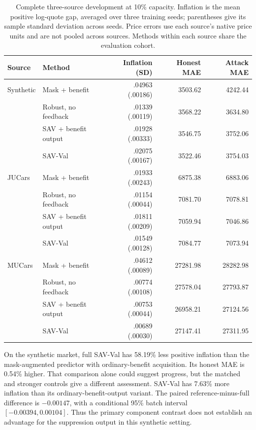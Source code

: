 \documentclass[10pt,journal]{IEEEtran}
\begin{document}
\begin{table}[t]
\centering
\caption{Complete three-source development at 10\% capacity. Inflation is
the mean positive log-quote gap, averaged over three training seeds;
parentheses give its sample standard deviation across seeds. Price errors
use each source's native price units and are not pooled across sources.
Methods within each source share the evaluation cohort.}
\label{tab:synthetic_development}
\begin{tabular}{llrrr}
\toprule
Source & Method & Inflation (SD) & Honest MAE & Attack MAE\\
\midrule
Synthetic & Mask + benefit & .04963 (.00186) & 3503.62 & 4242.44\\
 & Robust, no feedback & .01339 (.00119) & 3568.22 & 3634.80\\
 & SAV + benefit output & .01928 (.00333) & 3546.75 & 3752.06\\
 & SAV-Val & .02075 (.00167) & 3522.46 & 3754.03\\
\midrule
JUCars & Mask + benefit & .01933 (.00243) & 6875.38 & 6883.06\\
 & Robust, no feedback & .01154 (.00044) & 7081.70 & 7078.81\\
 & SAV + benefit output & .01811 (.00209) & 7059.94 & 7046.86\\
 & SAV-Val & .01549 (.00128) & 7084.77 & 7073.94\\
\midrule
MUCars & Mask + benefit & .04612 (.00089) & 27281.98 & 28282.98\\
 & Robust, no feedback & .00774 (.00108) & 27578.04 & 27793.87\\
 & SAV + benefit output & .00753 (.00044) & 26958.21 & 27124.56\\
 & SAV-Val & .00689 (.00030) & 27147.41 & 27311.95\\
\bottomrule
\end{tabular}
\end{table}

On the synthetic market, full SAV-Val has 58.19\% less positive inflation than the mask-augmented
predictor with ordinary-benefit acquisition. Its honest MAE is 0.54\%
higher. That comparison alone could suggest progress, but the matched
and stronger controls give a different assessment. SAV-Val has 7.63\%
more inflation than its ordinary-benefit-output variant. The paired
reference-minus-full difference is $-0.00147$, with a conditional
95\% batch interval $[-0.00394,0.00104]$. Thus the primary component
contrast does not establish an advantage for the suppression output in
this synthetic setting.
\end{document}
